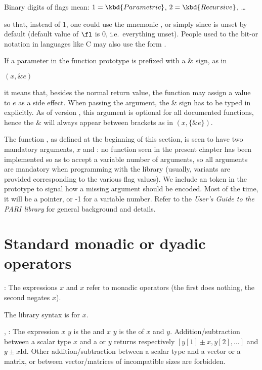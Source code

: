 \centerline{Binary digits of flags mean: $1=\kbd{Parametric}$,
$2=\kbd{Recursive}$, \dots}

\noindent so that, instead of $1$, one could use the mnemonic
, or simply  since
 is unset by default (default value of $\fl$ is $0$,
i.e.~everything unset). People used to the bit-or notation in languages like
C may also use the form .

  If a parameter in the function
prototype is prefixed with a \& sign, as in

$(x,\&e)$

\noindent it means that, besides the normal return value, the function may
assign a value to $e$ as a side effect. When passing the argument, the \&
sign has to be typed in explicitly. As of version \vers, this 
argument is optional for all documented functions, hence the \& will always
appear between brackets as in $(x,\{\&e\})$.

The  function , as defined at the beginning of this
section, is seen to have two mandatory arguments, $x$ and \fl: no function
seen in the present chapter has been implemented so as to accept a variable
number of arguments, so all arguments are mandatory when programming with the
library (usually, variants are provided corresponding to the various flag values).
We include an  token in the prototype to signal how a missing
argument should be encoded. Most of the time, it will be a  pointer, or
-1 for a variable number. Refer to the \emph{User's Guide to the PARI library}
for general background and details.

\section{Standard monadic or dyadic operators}

\subseckbd{+$/$-}: The expressions \kbd{+}$x$ and \kbd{-}$x$ refer
to monadic operators (the first does nothing, the second negates $x$).

The library syntax is  for \kbd{-}$x$.

\subseckbd{+}, \kbd{-}: The expression $x$ \kbd{+} $y$ is the  and
$x$ \kbd{-} $y$ is the  of $x$ and $y$. Addition/subtraction
between a scalar type $x$ and a  or  $y$ returns
respectively $[y[1] \pm x, y[2],\dots]$ and $y \pm x \text{Id}$. Other
addition/subtraction between a scalar type and a vector or a matrix, or
between vector/matrices of incompatible sizes are forbidden.

